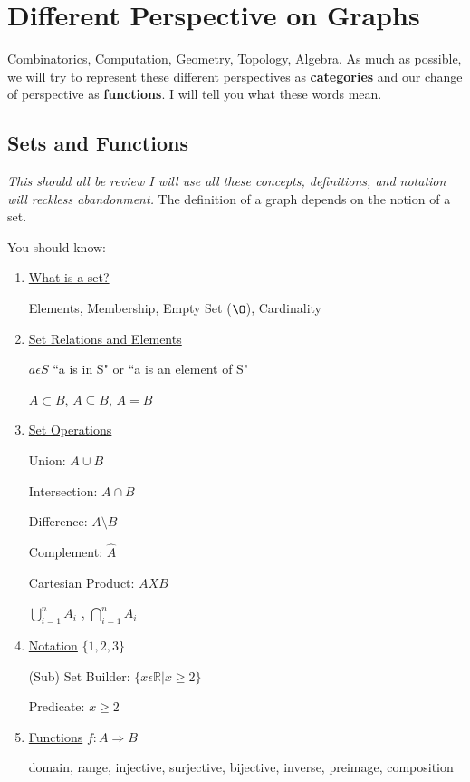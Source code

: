 \documentclass{article}
\begin{document}
\section{Different Perspective on Graphs}
Combinatorics, Computation, Geometry, Topology, Algebra. As much as possible, we will try to represent these different perspectives as \textbf{categories} and our change of perspective as \textbf{functions}. I will tell you what these words mean.

\subsection{Sets and Functions}
\textit{This should all be review I will use all these concepts, definitions, and notation will reckless abandonment.}
The definition of a graph depends on the notion of a set. 

You should know:
\begin{enumerate}
    \item \underline{What is a set?} 
    
    Elements, Membership, Empty Set ($\O$), Cardinality
    \item \underline{Set Relations and Elements}
    
    $a \epsilon S$ ``a is in S" or ``a is an element of S"
    
    $A \subset B$, $A \subseteq B$, $A = B$
    \item \underline{Set Operations}
    
    Union: $A \cup B$ 
    
    Intersection: $A \cap B$
    
    Difference: $A \setminus B$
    
    Complement: $\hat{A}$
    
    Cartesian Product: $A X B$
    
    $\bigcup\limits_{i = 1}^{n} A_i$ ,  $\bigcap\limits_{i = 1}^{n} A_i$
    \item \underline{Notation}
    $\{1,2,3\}$
    
    (Sub) Set Builder: $\{x \epsilon \mathbb{R}| x \geq 2\}$
    
    Predicate: $x \geq 2$
    \item \underline{Functions}
    $f: A \Rightarrow B$
    
    domain, range, injective, surjective, bijective, inverse, preimage, composition

\end{enumerate}
\end{document}
